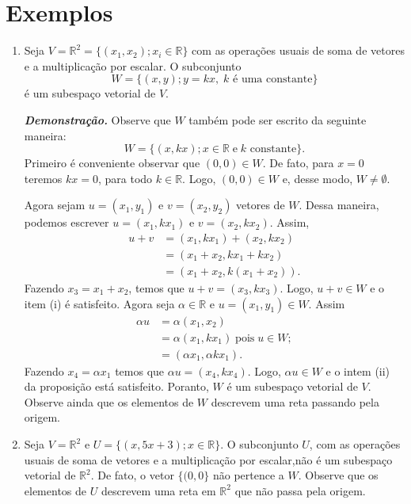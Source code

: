 \section{Exemplos}
\begin{enumerate}


\item Seja $V=\mathbb{R}^2=\{(x_1, x_2); x_i \in \mathbb{R}\}$ com as operações usuais de  soma de vetores e a multiplicação por escalar.  O subconjunto
$$W=\{(x, y); y=kx, \; \text{$k$ é uma constante} \}$$ é um subespaço vetorial de $V$.

\textbf{\textit{Demonstração.}}
Observe que $W$ também pode ser escrito da seguinte maneira:
$$W=\{(x, kx);  x \in \mathbb{R} \; \text{e}\; \text{$k$ constante} \}.$$   Primeiro é conveniente observar que $(0,0) \in W$. De fato, para $x=0$ teremos $kx=0$, para todo $k\in \mathbb{R}$. Logo, $(0,0) \in W$ e, desse modo, $W \neq \emptyset$.

Agora sejam $u=(x_1, y_1)$ e $v=(x_2, y_2)$ vetores de $W$.  Dessa maneira, podemos escrever $u=(x_1, kx_1)$ e $v=(x_2, kx_2)$. Assim,
\begin{align*}
u+v &=(x_1, kx_1)+(x_2, kx_2)\\
       &=(x_1+x_2, kx_1+kx_2)\\
       &=(x_1+x_2, k(x_1+x_2)).
\end{align*}
Fazendo $x_3=x_1+x_2$, temos que $u+v =(x_3, kx_3)$. Logo, $u+v \in W$ e o item (i) é satisfeito.  Agora seja  $\alpha \in \mathbb{R}$ e $u=(x_1, y_1) \in W$. Assim
\begin{align*}
\alpha u &=\alpha(x_1,x_2)\\
            &=\alpha (x_1, kx_1) \; \text{pois} \;  u \in W;\\
       &=(\alpha x_1, \alpha k x_1).
\end{align*}
 Fazendo $x_4=\alpha x_1$ temos que $\alpha u=(x_4, kx_4)$. Logo, $\alpha u \in W$ e o intem (ii) da proposição está satisfeito.  Poranto, $W$ é um subespaço vetorial de $V$. Observe ainda que os elementos de  $W$ descrevem uma reta passando pela origem.

\item Seja $V=\mathbb{R}^2$ e $U=\{(x, 5x+3);  x \in \mathbb{R}\}$.  O subconjunto $U$,  com as operações usuais de  soma de vetores e a multiplicação por escalar,não é um subespaço vetorial de $\mathbb{R}^2$.   De fato,  o vetor $\{(0,0\}$ não pertence a $W$. Observe que os elementos de $U$ descrevem uma reta em $\mathbb{R}^2$ que não passa pela origem.



\end{enumerate}
